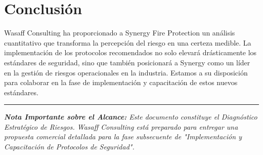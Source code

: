 \documentclass[11pt, a4paper]{article}
\begin{document}
\section{Conclusión}

Wasaff Consulting ha proporcionado a Synergy Fire Protection un análisis cuantitativo que transforma la percepción del riesgo en una certeza medible. La implementación de los protocolos recomendados no solo elevará drásticamente los estándares de seguridad, sino que también posicionará a Synergy como un líder en la gestión de riesgos operacionales en la industria. Estamos a su disposición para colaborar en la fase de implementación y capacitación de estos nuevos estándares.

\vspace{1.5cm}
\begin{center}
\rule{0.8\textwidth}{0.4pt}
\end{center}
\vspace{0.3cm}
\begin{center}
\parbox{0.8\textwidth}{\footnotesize\itshape \textbf{Nota Importante sobre el Alcance:} Este documento constituye el Diagnóstico Estratégico de Riesgos. Wasaff Consulting está preparado para entregar una propuesta comercial detallada para la fase subsecuente de "Implementación y Capacitación de Protocolos de Seguridad".}
\end{center}
\end{document}
